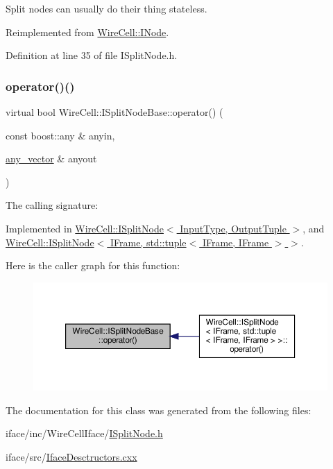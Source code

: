 Split nodes can usually do their thing stateless. 



Reimplemented from \hyperlink{class_wire_cell_1_1_i_node_a87d2b7293da4f6955e389ac6a2011306}{Wire\+Cell\+::\+I\+Node}.



Definition at line 35 of file I\+Split\+Node.\+h.

\mbox{\label{class_wire_cell_1_1_i_split_node_base_a40983dc11d8835581d0abcd1989cbc44}} 
\subsubsection{\texorpdfstring{operator()()}{operator()()}}
{\footnotesize\ttfamily virtual bool Wire\+Cell\+::\+I\+Split\+Node\+Base\+::operator() (\begin{DoxyParamCaption}\item[{const boost\+::any \&}]{anyin,  }\item[{\hyperlink{class_wire_cell_1_1_i_split_node_base_af68870ead16af4b29a3b0d486f217fe8}{any\+\_\+vector} \&}]{anyout }\end{DoxyParamCaption})\hspace{0.3cm}{\ttfamily [pure virtual]}}



The calling signature\+: 



Implemented in \hyperlink{class_wire_cell_1_1_i_split_node_a7c33f98661c236a21d093bb40374186b}{Wire\+Cell\+::\+I\+Split\+Node$<$ Input\+Type, Output\+Tuple $>$}, and \hyperlink{class_wire_cell_1_1_i_split_node_a7c33f98661c236a21d093bb40374186b}{Wire\+Cell\+::\+I\+Split\+Node$<$ I\+Frame, std\+::tuple$<$ I\+Frame, I\+Frame $>$ $>$}.

Here is the caller graph for this function\+:
\nopagebreak
\begin{figure}[H]
\begin{center}
\leavevmode
\includegraphics[width=350pt]{class_wire_cell_1_1_i_split_node_base_a40983dc11d8835581d0abcd1989cbc44_icgraph}
\end{center}
\end{figure}


The documentation for this class was generated from the following files\+:\begin{DoxyCompactItemize}
\item 
iface/inc/\+Wire\+Cell\+Iface/\hyperlink{_i_split_node_8h}{I\+Split\+Node.\+h}\item 
iface/src/\hyperlink{_iface_desctructors_8cxx}{Iface\+Desctructors.\+cxx}\end{DoxyCompactItemize}
